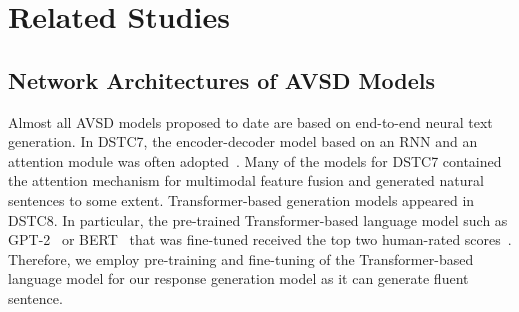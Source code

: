 \documentclass[letterpaper]{article} %
\begin{document}
\section{Related Studies}

\subsection{Network Architectures of AVSD Models}
Almost all AVSD models proposed to date are based on end-to-end neural text generation.
In DSTC7, the encoder-decoder model based on an RNN and an attention module was often adopted~\cite{Nguyen2018from,Hori2019end}.
%
Many of the models for DSTC7 contained the attention mechanism for multimodal feature fusion and generated natural sentences to some extent.
Transformer-based generation models appeared in DSTC8.
In particular, the pre-trained Transformer-based language model such as GPT-2~\cite{Radford2019language} or BERT~\cite{Devlin2018bert} that was fine-tuned received the top two human-rated scores~\cite{Li2021bridging,Chen2020pretraining}.
Therefore, we employ pre-training and fine-tuning of the Transformer-based language model for our response generation model as it can generate fluent sentence.

\end{document}
